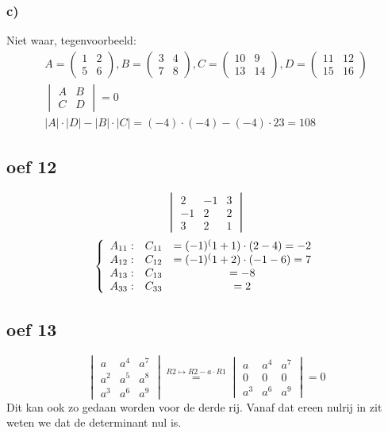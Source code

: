 \documentclass[lineaire_algebra_oplossingen.tex]{subfiles}
\begin{document}
\subsubsection*{c)}
Niet waar, tegenvoorbeeld:
\begin{gather*}
    A = 
    \begin{pmatrix}
        1 & 2\\
        5 & 6
    \end{pmatrix} 
    , B = 
    \begin{pmatrix}
        3 & 4\\
        7 & 8
    \end{pmatrix}
    , C = 
    \begin{pmatrix}
        10 & 9\\
        13 & 14
    \end{pmatrix}
    , D = 
    \begin{pmatrix}
        11 & 12\\
        15 & 16
    \end{pmatrix}\\
    \begin{vmatrix}
        A & B\\
        C & D
    \end{vmatrix}
    = 0\\
    |A| \cdot |D| - |B| \cdot |C| = (-4) \cdot (-4) - (-4) \cdot 23 = 108
\end{gather*}


\subsection{oef 12}
\[
\begin{vmatrix}
2 & -1 & 3\\
-1 & 2 & 2\\
3 & 2 & 1
\end{vmatrix}
\]
\[
\left\lbrace
\begin{array}{c c c}
A_{11}: &C_{11} &= (-1)^(1+1) \cdot (2 - 4) = -2\\
A_{12}: &C_{12} &= (-1)^(1+2) \cdot (-1 -6) = 7\\
A_{13}: &C_{13} &= -8\\
A_{33}: &C_{33} &= 2\\
\end{array}
\right.
\]
\subsection{oef 13}
$$
\begin{vmatrix}
a & a^4 & a^7\\
a^2 & a^5 & a^8\\
a^3 & a^6 & a^9
\end{vmatrix}
\overset{R2 \longmapsto R2 - a \cdot R1}{=}
\begin{vmatrix}
a & a^4 & a^7\\
0 & 0 & 0\\
a^3 & a^6 & a^9
\end{vmatrix}
= 0
$$
Dit kan ook zo gedaan worden voor de derde rij. Vanaf dat ereen nulrij in zit weten we dat de determinant nul is.
\end{document}
